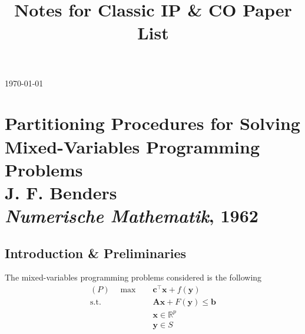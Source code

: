 
\title{Notes for Classic IP \& CO Paper List}

	\maketitle
	\today

	\clearpage
	\thispagestyle{plain}
	\par{}

	\tableofcontents


	\chapter[Partitioning Procedures for Solving Mixed-Variables Programming Problems]
		{Partitioning Procedures for Solving Mixed-Variables Programming Problems \\[\bigskipamount]
		\Large J. F. Benders \\[\bigskipamount]
		\large \textit{Numerische Mathematik}, 1962}\label{chp:Benders-Decom}

		\section{Introduction \& Preliminaries}
			The mixed-variables programming problems considered is the following
			\begin{align*}
				(P) \quad \max \quad & \mathbf{c}^\top \mathbf{x} + f(\mathbf{y})\\
				\text{s.t.} \quad & \mathbf{Ax} + F(\mathbf{y}) \le \mathbf{b}\\
				& \mathbf{x} \in \mathbb{R}^p \\
				& \mathbf{y} \in S
			\end{align*}

